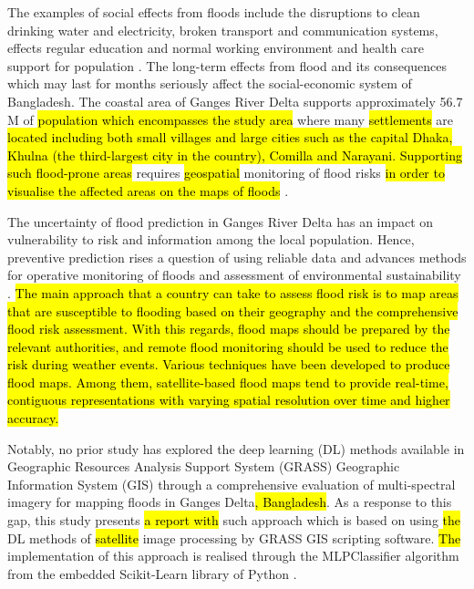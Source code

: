 \documentclass[water,article,submit,pdftex,moreauthors]{Definitions/mdpi}
\begin{document}
The examples of social effects from floods include the disruptions to clean drinking water and electricity, broken transport and communication systems, effects regular education and normal working environment and health care support for population \cite{JERIN2023103851,NAHIN2023e14520}. The long-term effects from flood and its consequences which may last for months  seriously affect the social-economic system of Bangladesh. The coastal area of Ganges River Delta supports approximately 56.7 M of \hl{population which encompasses the study area} \cite{DAS2021101983} where many \hl{settlements} are \hl{located including both small villages and large cities such as the capital Dhaka, Khulna (the third-largest city in the country), Comilla and Narayani. Supporting such flood-prone areas }requires\hl{ geospatial }monitoring of flood risks \hl{in order to visualise the affected areas on the maps of floods} \cite{Alietal,AZAD2023100498}.

The uncertainty of flood prediction in Ganges River Delta has an impact on vulnerability to risk and information among the local population. Hence, preventive prediction rises a question of using reliable data and advances methods for operative monitoring of floods and assessment of environmental sustainability \cite{NICHOLLS2016370}. \hl{The main approach that a country can take to assess flood risk is to map areas that are susceptible to flooding based on their geography and the comprehensive flood risk assessment. With this regards, flood maps should be prepared by the relevant authorities, and remote flood monitoring should be used to reduce the risk during weather events. Various techniques have been developed to produce flood maps. Among them, satellite-based flood maps tend to provide real-time, contiguous representations with varying spatial resolution over time and higher accuracy.}

Notably, no prior study has explored the deep learning (DL) methods available in Geographic Resources Analysis Support System (GRASS) Geographic Information System (GIS) \cite{GRASS_GIS_software} through a comprehensive evaluation of multi-spectral imagery for mapping floods in Ganges Delta\hl{, Bangladesh}. As a response to this gap, this study presents \hl{a report with} such approach which is based on using \hl{the }DL methods of \hl{satellite }image processing by GRASS GIS scripting software. \hl{The }implementation of this approach is realised through the MLPClassifier algorithm\hl{ }from the embedded Scikit-Learn library of Python \cite{pedregosa2011scikit,van1995python}. 
\end{document}
